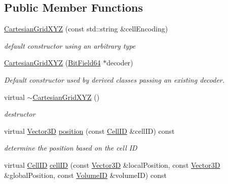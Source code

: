 \subsection*{Public Member Functions}
\begin{DoxyCompactItemize}
\item 
\hyperlink{class_d_d4hep_1_1_d_d_segmentation_1_1_cartesian_grid_x_y_z_a1e888c86452db8dc811b59c7b3298b04}{CartesianGridXYZ} (const std::string \&cellEncoding)
\begin{DoxyCompactList}\small\item\em default constructor using an arbitrary type \item\end{DoxyCompactList}\item 
\hyperlink{class_d_d4hep_1_1_d_d_segmentation_1_1_cartesian_grid_x_y_z_a0667982b480a2fea3f70a16d8f236e22}{CartesianGridXYZ} (\hyperlink{class_d_d4hep_1_1_d_d_segmentation_1_1_bit_field64}{BitField64} $\ast$decoder)
\begin{DoxyCompactList}\small\item\em Default constructor used by derived classes passing an existing decoder. \item\end{DoxyCompactList}\item 
virtual \hyperlink{class_d_d4hep_1_1_d_d_segmentation_1_1_cartesian_grid_x_y_z_aff2cbae986ce2cec75de80968a1015a3}{$\sim$CartesianGridXYZ} ()
\begin{DoxyCompactList}\small\item\em destructor \item\end{DoxyCompactList}\item 
virtual \hyperlink{struct_d_d4hep_1_1_d_d_segmentation_1_1_vector3_d}{Vector3D} \hyperlink{class_d_d4hep_1_1_d_d_segmentation_1_1_cartesian_grid_x_y_z_a029a72904042397250b67948270884ac}{position} (const \hyperlink{namespace_d_d4hep_1_1_d_d_segmentation_ac7af071d85cb48820914434a07e21ba1}{CellID} \&cellID) const 
\begin{DoxyCompactList}\small\item\em determine the position based on the cell ID \item\end{DoxyCompactList}\item 
virtual \hyperlink{namespace_d_d4hep_1_1_d_d_segmentation_ac7af071d85cb48820914434a07e21ba1}{CellID} \hyperlink{class_d_d4hep_1_1_d_d_segmentation_1_1_cartesian_grid_x_y_z_a50e24896d0efee32af5349b3c69d4866}{cellID} (const \hyperlink{struct_d_d4hep_1_1_d_d_segmentation_1_1_vector3_d}{Vector3D} \&localPosition, const \hyperlink{struct_d_d4hep_1_1_d_d_segmentation_1_1_vector3_d}{Vector3D} \&globalPosition, const \hyperlink{namespace_d_d4hep_1_1_d_d_segmentation_a61a6833a18d1800bdef176595f83e3ba}{VolumeID} \&volumeID) const 

\end{DoxyCompactItemize}
